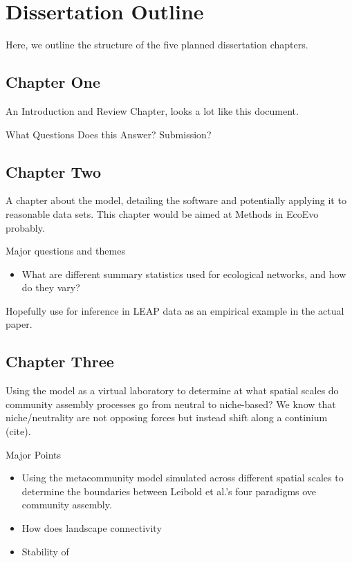\documentclass[]{article}
\begin{document}
%
%
%
\clearpage
\hypertarget{dissertation-outline}{%
\section{Dissertation Outline}\label{dissertation-outline}}

Here, we outline the structure of the five planned dissertation chapters.

\subsection{Chapter One}

An Introduction and Review Chapter, looks a lot like this document.

What Questions Does this Answer? Submission?

\subsection{Chapter Two}

A chapter about the model, detailing the software and potentially applying it to reasonable data sets.
This chapter would be aimed at Methods in EcoEvo probably.

Major questions and themes
\begin{itemize}
    \item What are different summary statistics used for ecological networks, and how do they vary?
\end{itemize}



Hopefully use for inference in LEAP data as an empirical example in the actual paper.


\subsection{Chapter Three}

Using the model as a virtual laboratory \citep{rollsback_agent_2005} to determine at what spatial scales do community assembly processes go from neutral to niche-based? We know that niche/neutrality are not opposing forces but instead shift along a continium (cite).

Major Points

\begin{itemize}
    \item Using the metacommunity model simulated across different spatial scales
          to determine the boundaries between Leibold et al.'s four paradigms ove community assembly.
    \item How does landscape connectivity
    \item Stability of 
\end{itemize}
\end{document}
